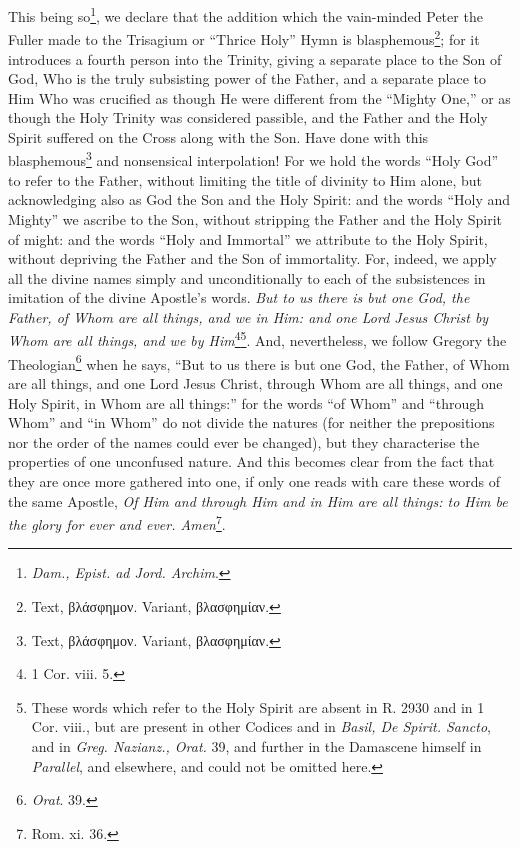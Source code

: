 This being so\footnote{\emph{Dam., Epist. ad Jord. Archim}.}, we declare that the addition which the vain-minded Peter the Fuller made to the Trisagium or “Thrice Holy” Hymn is blasphemous\footnote{Text, \textgreek{βλάσφημον}. Variant, \textgreek{βλασφημίαν}.}; for it introduces a fourth person into the Trinity, giving a separate place to the Son of God, Who is the truly subsisting power of the Father, and a separate place to Him Who was crucified as though He were different from the “Mighty One,” or as though the Holy Trinity was considered passible, and the Father and the Holy Spirit suffered on the Cross along with the Son. Have done with this blasphemous\footnote{Text, \textgreek{βλάσφημον}. Variant, \textgreek{βλασφημίαν}.} and nonsensical interpolation! For we hold the words “Holy God” to refer to the Father, without limiting the title of divinity to Him alone, but acknowledging also as God the Son and the Holy Spirit: and the words  “Holy and Mighty” we ascribe to the Son, without stripping the Father and the Holy Spirit of might: and the words “Holy and Immortal” we attribute to the Holy Spirit, without depriving the Father and the Son of immortality. For, indeed, we apply all the divine names simply and unconditionally to each of the subsistences in imitation of the divine Apostle’s words. \emph{But to us there is but one God, the Father, of Whom are all things, and we in Him: and one Lord Jesus Christ by Whom are all things, and we by Him}\footnote{1 Cor. viii. 5.}\textsuperscript{}\footnote{These words which refer to the Holy Spirit are absent in R. 2930 and in 1 Cor. viii., but are present in other Codices and in \emph{Basil, De Spirit. Sancto}, and in \emph{Greg. Nazianz., Orat. }39, and further in the Damascene himself in \emph{Parallel}, and elsewhere, and could not be omitted here.}\textsuperscript{}. And, nevertheless, we follow Gregory the Theologian\footnote{\emph{Orat}. 39.} when he says, “But to us there is but one God, the Father, of Whom are all things, and one Lord Jesus Christ, through Whom are all things, and one Holy Spirit, in Whom are all things:” for the words “of Whom” and “through Whom” and “in Whom” do not divide the natures (for neither the prepositions nor the order of the names could ever be changed), but they characterise the properties of one unconfused nature. And this becomes clear from the fact that they are once more gathered into one, if only one reads with care these words of the same Apostle, \emph{Of Him and through Him and in Him are all things: to Him be the glory for ever and ever. Amen}\footnote{Rom. xi. 36.}.

